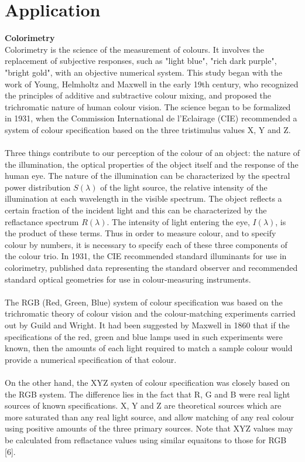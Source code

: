 \documentclass[a4paper,12pt]{report}
\begin{document}
\chapter{Application}
\textbf{Colorimetry}\\
Colorimetry is the science of the measurement of colours. It involves the replacement of subjective responses, such as "light blue", "rich dark purple", "bright gold", with an objective numerical system. This study began with the work of Young, Helmholtz and Maxwell in the early 19th century, who recognized the principles of additive and subtractive colour mixing, and proposed the trichromatic nature of human colour vision. The science began to be formalized in 1931, when the Commission International de l'Eclairage (CIE) recommended a system of colour specification based on the three tristimulus values X, Y and Z.\\\\
Three things contribute to our perception of the colour of an object: the nature of the illumination, the optical properties of the object itself and the response of the human eye. The nature of the illumination can be characterized by the spectral power distribution $S(\lambda)$ of the light source, the relative intensity of the illumination at each wavelength in the visible spectrum. The object reflects a certain fraction of the incident light and this can be characterized by the reflactance spectrum $R(\lambda)$. The intensity of light entering the eye, $I(\lambda)$, is the product of these terms. Thus in order to measure colour, and to specify colour by numbers, it is necessary to specify each of these three components of the colour trio. In 1931, the CIE recommended standard illuminants for use in colorimetry, published data representing the standard observer and recommended standard optical geometries for use in colour-measuring instruments.\\\\
The RGB (Red, Green, Blue) system of colour specification was based on the trichromatic theory of colour vision and the colour-matching experiments carried out by Guild and Wright. It had been suggested by Maxwell in 1860  that if the specifications of the red, green and blue lamps used in such experiments were known, then the amounts of each light required to match a sample colour would provide a numerical specification of that colour.\\\\
On the other hand, the XYZ systen of colour specification was closely based on the RGB system. The difference lies in the fact that R, G and B were real light sources of known specifications. X, Y and Z are theoretical sources which are more saturated than any real light source, and allow matching of any real colour using positive amounts of the three primary sources. Note that XYZ values may be calculated from reflactance values using similar equaitons to those for RGB [6].
\end{document}
